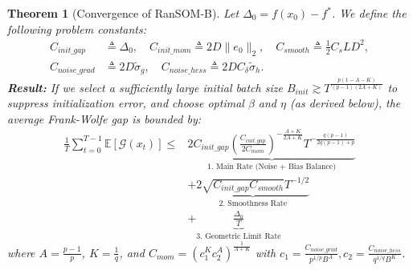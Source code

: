 \documentclass{article}
\theoremstyle{plain}
\newtheorem{theorem}{Theorem}[section]
\theoremstyle{definition}
\theoremstyle{remark}
\begin{document}
\begin{theorem}[Convergence of RanSOM-B]
\label{thm:betasom_convergence}
Let $\Delta_0 = f(x_0) - f^*$. We define the following problem constants:
\begin{align}
    C_{init\_gap} &\triangleq \Delta_0, \quad C_{init\_mom} \triangleq 2D \|e_0\|_2, \quad C_{smooth} \triangleq \frac{1}{2} C_s L D^2, \\
    C_{noise\_grad} &\triangleq 2D \tilde{\sigma}_g, \quad C_{noise\_hess} \triangleq 2D C_\delta \tilde{\sigma}_h.
\end{align}
\textbf{Result:}
If we select a sufficiently large initial batch size $B_{init} \gtrsim T^{\frac{p(1 - A - K)}{(p-1)(2A+K)}}$ to suppress initialization error, and choose optimal $\beta$ and $\eta$ (as derived below), the average Frank-Wolfe gap is bounded by:
\begin{align}
\label{eq:constrained_final_rates}
    \frac{1}{T} \sum_{t=0}^{T-1} \mathbb{E}[\mathcal{G}(x_t)] \le & \underbrace{2 C_{init\_gap} \left( \frac{C_{init\_gap}}{2 C_{mom}} \right)^{-\frac{A+K}{2A+K}} T^{-\frac{q(p-1)}{2q(p-1)+p}}}_{\text{1. Main Rate (Noise + Bias Balance)}} \nonumber \\
    & + \underbrace{2 \sqrt{C_{init\_gap} C_{smooth}} T^{-1/2}}_{\text{2. Smoothness Rate}} \nonumber \\
    & + \underbrace{\frac{\Delta_0}{T}}_{\text{3. Geometric Limit Rate}}
\end{align}
where $A = \frac{p-1}{p}$, $K = \frac{1}{q}$, and $C_{mom} = (c_1^K c_2^A)^{\frac{1}{A+K}}$ with $c_1 = \frac{C_{noise\_grad}}{p^{1/p} B^A}, c_2 = \frac{C_{noise\_hess}}{q^{1/q} B^K}$.
\end{theorem}
\end{document}

